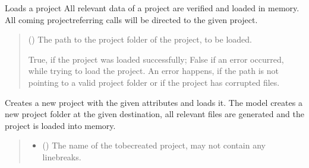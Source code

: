 \documentclass[letterpaper,10pt,english]{sphinxmanual}
\begin{document}
\begin{fulllineitems}
\begin{fulllineitems}
\label{\detokenize{apidoc/src.osm_configurator.control:src.osm_configurator.control.control_interface.IControl.load_project}}
\pysigstartsignatures
{}
\pysigstopsignatures
\sphinxAtStartPar
Loads a project
All relevant data of a project are verified and loaded in memory. All coming project\sphinxhyphen{}referring calls will be directed to the given project.
\begin{quote}\begin{description}
\sphinxAtStartPar
{} () \textendash{} The path to the project folder of the project, to be loaded.

\sphinxAtStartPar
True, if the project was loaded successfully; False if an error occurred, while trying to load the project. An error happens, if the path is not pointing to a valid project folder or if the project has corrupted files.

\sphinxAtStartPar
{}

\end{description}\end{quote}

\end{fulllineitems}


\begin{fulllineitems}
\label{\detokenize{apidoc/src.osm_configurator.control:src.osm_configurator.control.control_interface.IControl.create_project}}
\pysigstartsignatures
{}
\pysigstopsignatures
\sphinxAtStartPar
Creates a new project with the given attributes and loads it.
The model creates a new project folder at the given destination, all relevant files are generated and the project is loaded into memory.
\begin{quote}\begin{description}
\begin{itemize}
\item {} 
\sphinxAtStartPar
{} () \textendash{} The name of the to\sphinxhyphen{}be\sphinxhyphen{}created project, may not contain any line\sphinxhyphen{}breaks.


\end{itemize}
\end{description}
\end{quote}
\end{fulllineitems}
\end{fulllineitems}
\end{document}
